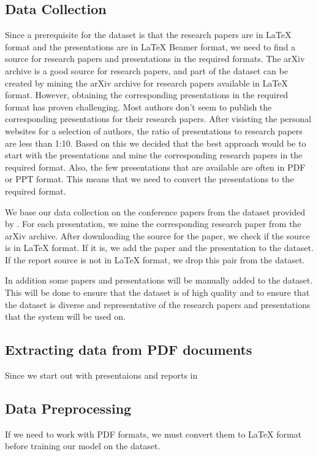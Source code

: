 \subsection{Data Collection}
Since a prerequisite for the dataset is that the research papers are in \LaTeX{} format and the presentations are in \LaTeX{} Beamer format, we need to find a source for research papers and presentations in the required formats. The arXiv archive is a good source for research papers, and part of the dataset can be created by mining the arXiv archive for research papers available in \LaTeX{} format. However, obtaining the corresponding presentations in the required format has proven challenging. Most authors don't seem to publish the corresponding presentations for their research papers. After visisting the personal websites for a selection of authors, the ratio of presentations to research papers are less than 1:10. Based on this we decided that the best approach would be to start with the presentations and mine the corresponding research papers in the required format. Also, the few presentations that are available are often in PDF or PPT format. This means that we need to convert the presentations to the required format. 

We base our data collection on the conference papers from the dataset provided by \citet{Fu:2022:AAAI}. For each presentation, we mine the corresponding research paper from the arXiv archive. After downloading the source for the paper, we check if the source is in \LaTeX{} format. If it is, we add the paper and the presentation to the dataset. If the report source is not in \LaTeX{} format, we drop this pair from the dataset.

In addition some papers and presentations will be manually added to the dataset. This will be done to ensure that the dataset is of high quality and to ensure that the dataset is diverse and representative of the research papers and presentations that the system will be used on.



\subsection{Extracting data from PDF documents}
Since we start out with presentaions and reports in 

\subsection{Data Preprocessing}
If we need to work with PDF formats, we must convert them to \LaTeX{} format before training our model on the dataset. 

